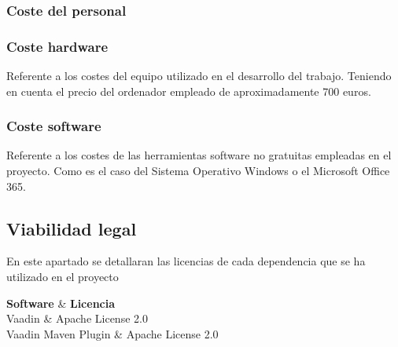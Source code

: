 \subsubsection{Coste del personal}

\subsubsection{Coste hardware}
Referente a los costes del equipo utilizado en el desarrollo del trabajo. Teniendo en cuenta el precio del ordenador empleado de aproximadamente 700 euros.

\subsubsection{Coste software}
Referente a los costes de las herramientas software no gratuitas empleadas en el proyecto. Como es el caso del Sistema Operativo Windows o el Microsoft Office 365.

\subsection{Viabilidad legal}
En este apartado se detallaran las licencias de cada dependencia que se ha utilizado en el proyecto

{\textbf{Software} & \textbf{Licencia} \\}{
	Vaadin & Apache License 2.0 \\
	Vaadin Maven Plugin & Apache License 2.0 \\
}